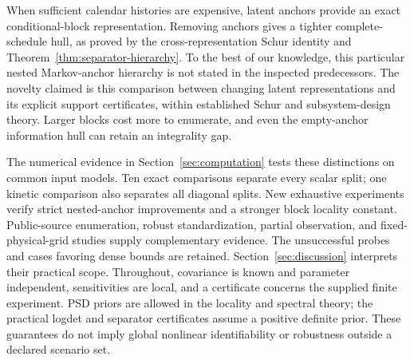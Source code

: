 When sufficient calendar histories are expensive, latent anchors provide an
exact conditional-block representation. Removing anchors gives a tighter
complete-schedule hull, as proved by the cross-representation Schur identity
and Theorem~\ref{thm:separator-hierarchy}. To the best of our knowledge, this
particular nested Markov-anchor hierarchy is not stated in the inspected
predecessors. The novelty claimed is this comparison between changing latent
representations and its explicit support certificates, within established
Schur and subsystem-design theory. Larger blocks cost more to enumerate, and
even the empty-anchor information hull can retain an integrality gap.

The numerical evidence in Section~\ref{sec:computation} tests these distinctions
on common input models. Ten exact comparisons separate every scalar split;
one kinetic comparison also separates all diagonal splits. New exhaustive
experiments verify strict nested-anchor improvements and a stronger block
locality constant. Public-source enumeration, robust standardization, partial
observation, and fixed-physical-grid studies supply complementary evidence.
The unsuccessful probes and cases favoring dense bounds are retained.
Section~\ref{sec:discussion} interprets their practical scope.
Throughout, covariance is known and parameter independent, sensitivities are
local, and a certificate concerns the supplied finite experiment. PSD priors
are allowed in the locality and spectral theory; the practical logdet and
separator certificates assume a positive definite prior. These guarantees do
not imply global nonlinear identifiability or robustness outside a declared
scenario set.
